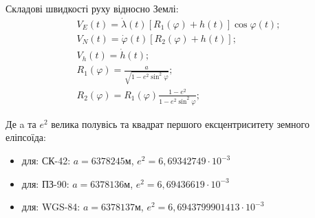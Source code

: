Складові швидкості руху відносно Землі:
\begin{equation}
\label{emu_path_vel} 
\begin{array}{l}
{V_{E} (t)=\dot{\lambda }(t)\left[R_{1} (\varphi )+h(t)\right]\cos \varphi (t);} \\ 
{V_{N} (t)=\dot{\varphi }(t)[R_{2} (\varphi )+h(t)];} \\ 
{V_{h} (t)=\dot{h}(t);} \\ {R_{1} (\varphi )=\frac{a}{\sqrt{1-e^{2} \sin ^{2} \varphi } } ;} \\ 
{R_{2} (\varphi )=R_{1} (\varphi )\frac{1-e^{2} }{1-e^{2} \sin ^{2} \varphi } ;} 
\end{array} 
\end{equation}

Де a та $e^2$ велика полувісь та квадрат першого ексцентриситету земного еліпсоїда: 
\begin{itemize}
 \item для: СК-42: $a=6378245$м,  $e^2=6,69342749\cdotp 10^{-3}$
 \item для: ПЗ-90: $a=6378136$м,  $e^2=6,69436619\cdotp 10^{-3}$
 \item для: WGS-84: $a=6378137$м, $e^2=6,6943799901413\cdotp 10^{-3}$
\end{itemize}

